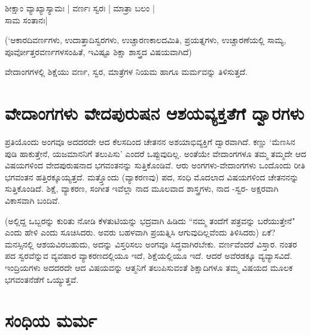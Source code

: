\begin{shloka}
ಶೀಕ್ಷಾಂ ವ್ಯಾಖ್ಯಾಸ್ಯಾಮಃ | ವರ್ಣಃ ಸ್ವರಃ | ಮಾತ್ರಾ ಬಲಂ |\\
ಸಾಮ ಸಂತಾನಃ|
\end{shloka}

(`ಆಕಾರದಿವರ್ಣಗಳು, ಉದಾತ್ತಾದಿಸ್ವರಗಳು, ಉಚ್ಚಾರಣಕಾಲದಮಿತಿ, ಪ್ರಯತ್ನಗಳು, ಉಚ್ಚಾರಣೆಯಲ್ಲಿ ಸಾಮ್ಯ, ಪೂರ್ವೋತ್ತರವರ್ಣಗಳಸಂಹಿತೆ, ಇವಿಷ್ಟೂ ಶಿಕ್ಷಾ ಶಾಸ್ತ್ರದ ವಿಷಯವಾಗಿದೆ)

ವೇದಾಂಗಗಳಲ್ಲಿ ಶಿಕ್ಷೆಯು ವರ್ಣ, ಸ್ವರ, ಮಾತ್ರೆಗಳ ನಿಯಮ ಹಾಗೂ ಮರ್ಮವನ್ನು ತಿಳಿಸುತ್ತದೆ.

\section*{ವೇದಾಂಗಗಳು ವೇದಪುರುಷನ ಆಶಯವ್ಯಕ್ತತೆಗೆ ದ್ವಾರಗಳು}

ಪ್ರತಿಯೊಂದು ಅಂಗವೂ ಅದದರದೇ ಆದ ಕೆಲಸದಿಂದ ಚೇತನನ ಅಶಯಾಭಿವ್ಯಕ್ತಿಗೆ ದ್ವಾರವಾಗಿದೆ. ಕಣ್ಣು `ಮೆಣಸಿನ ಪುಡಿ ಹಾಕುತ್ತೇನೆ, ಯಜಮಾನನಿಗೆ ತಲುಪಿಸು' ಎಂದರೆ ಒಪ್ಪುವುದಿಲ್ಲ. ಅಂತೆಯೇ ವೇದಾಂಗಗಳೂ ತಮ್ಮ ತಮ್ಮದೇ ಆದ ವಿಷಯಗಳಿಂದ ವೇದಪುರುಷನಾದ ಭಗವಂತನನ್ನು ಸುತ್ತಿಕೊಂಡಿವೆ. ಆರು ಅಂಗಗಳು-ವೇದಾಂಗಗಳು ಒಂದೊಂದು ರೀತಿ ಭಗವಂತನ ಹತ್ತಿರಕ್ಕೂಯ್ಯತ್ತದೆ. ಮತ್ತ್ತೊಂದು (ವ್ಯಾಕರಣವು) ಪದ, ಸಂಧಿ ಮೊದಲಾದ ವಿಷಯಗಳಿಂದ ಚೇತನನನ್ನು ಸುತ್ತಿಕೊಂಡಿದೆ. ಶಿಕ್ಷೆ, ವ್ಯಾಕರಣ, ಸಂಗೀತ ಇವೆಲ್ಲಾ ನಾದ ಮೂಲವಾದ ಶಾಸ್ತ್ರಗಳು, ನಾದ -ಸ್ವರ- ಅಕ್ಷರವಾಗಿ ವಿಕಾಸವಾಗಿ ಬಂದಿವೆ. 

(ಅಲ್ಲಿದ್ದ ಒಬ್ಬರನ್ನು ಕುರಿತು ನೋಡಿ ಕೆಳತುಟಿಯನ್ನು ಭದ್ರವಾಗಿ ಹಿಡಿದು ``ನಮ್ಮ ತಂದೆಗೆ ಪತ್ರವನ್ನು ಬರೆಯುತ್ತೇನೆ" ಎಂದು ಹೇಳಿ ಎಂದು ಸೂಚಿಸಿದರು. ಅವರು ಬಹಳವಾಗಿ ಪ್ರಯತ್ನಿಸಿ ಆಗುವುದಿಲ್ಲವೆಂದು ತಿಳಿಸಿದರು) ಏಕೆ? ಮನಸ್ಸಿನಲ್ಲಿ ಆಶಯವಿರಬಹುದು, ಅದನ್ನು ವಿಸ್ತರಿಸಲು ಅಂಗವೂ ಸಿದ್ಧವಾಗಿರಬೇಕು. ವರ್ಣವೆಂದರೆ ವಿಸ್ತಾರ. ನಂತರ ಪದ ಸ್ವರವೆನ್ನುವ ವ್ಯವಹಾರ ವ್ಯಾಕರಣದಲ್ಲಿಯೂ ಇದೆ, ಶಿಕ್ಷೆಯಲ್ಲಿಯೂ ಇದೆ. ಆದರೆ ಅವೆರಡಕ್ಕೂ ವ್ಯವ್ಯಾಸವಿದೆ. ಇಂದ್ರಿಯಗಳು ಅದದರದೇ ಆದ ವಿಷಯವನ್ನು ಆತ್ಮನಿಗೆ ತಲುಪಿಸುವಂತೆ ಶಿಕ್ಷಾದಿಗಳೂ ತಮ್ಮ ವಿಷಯದ ಮೂಲಕ ಭಗವಂತನೆಡೆಗೆ  ಒಯ್ಯುತ್ತವೆ.

\section*{ಸಂಧಿಯ ಮರ್ಮ}

